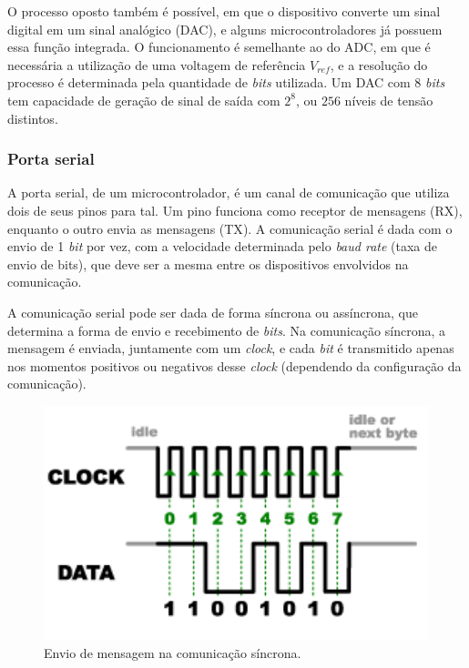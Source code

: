 O processo oposto também é possível, em que o dispositivo converte um sinal digital em um sinal analógico (\ac{DAC}), e alguns microcontroladores já possuem essa função integrada. O funcionamento é semelhante ao do \ac{ADC}, em que é necessária a utilização de uma voltagem de referência \(V_{ref}\), e a resolução do processo é determinada pela quantidade de \textit{bits} utilizada. Um \ac{DAC} com 8 \textit{bits} tem capacidade de geração de sinal de saída com \( 2^8 \), ou \(256\) níveis de tensão distintos.

\subsubsection{Porta serial}

A porta serial, de um microcontrolador, é um canal de comunicação que utiliza dois de seus pinos para tal. Um pino funciona como receptor de mensagens (\ac{RX}), enquanto o outro envia as mensagens (\ac{TX}). A comunicação serial é dada com o envio de 1 \textit{bit} por vez, com a velocidade determinada pelo \textit{baud rate} (taxa de envio de bits), que deve ser a mesma entre os dispositivos envolvidos na comunicação.

A comunicação serial pode ser dada de forma síncrona ou assíncrona, que determina a forma de envio e recebimento de \textit{bits}. Na comunicação síncrona, a mensagem é enviada, juntamente com um \textit{clock}, e cada \textit{bit} é transmitido apenas nos momentos positivos ou negativos desse \textit{clock} (dependendo da configuração da comunicação).

\begin{figure}[ht]
    \begin{center}
    \includegraphics{figuras/sincrono.PNG}
    \end{center}
    \caption[Comunicação síncrona]{Envio de mensagem na comunicação síncrona.}
    \label{sincrono}
\end{figure}


